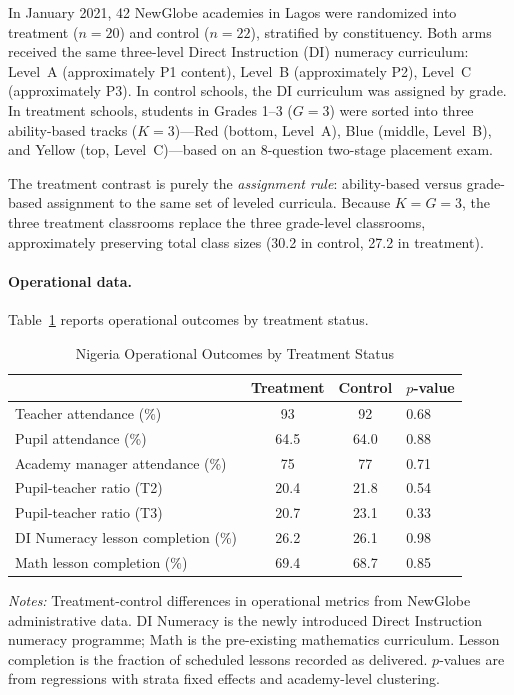 \documentclass[11pt]{article}
\begin{document}
In January 2021, 42 NewGlobe academies in Lagos were randomized into treatment ($n = 20$) and control ($n = 22$), stratified by constituency. Both arms received the same three-level Direct Instruction (DI) numeracy curriculum: Level~A (approximately P1 content), Level~B (approximately P2), Level~C (approximately P3). In control schools, the DI curriculum was assigned by grade. In treatment schools, students in Grades 1--3 ($G = 3$) were sorted into three ability-based tracks ($K = 3$)---Red (bottom, Level~A), Blue (middle, Level~B), and Yellow (top, Level~C)---based on an 8-question two-stage placement exam.

The treatment contrast is purely the \emph{assignment rule}: ability-based versus grade-based assignment to the same set of leveled curricula. Because $K = G = 3$, the three treatment classrooms replace the three grade-level classrooms, approximately preserving total class sizes (30.2 in control, 27.2 in treatment).

\paragraph{Operational data.} Table~\ref{tab:ng_operational} reports operational outcomes by treatment status.

\begin{table}[H]
\centering
\caption{Nigeria Operational Outcomes by Treatment Status}
\label{tab:ng_operational}
\begin{threeparttable}
\begin{tabular}[t]{lccl}
\toprule
 & Treatment & Control & $p$-value \\
\midrule
Teacher attendance (\%) & 93 & 92 & 0.68 \\
Pupil attendance (\%) & 64.5 & 64.0 & 0.88 \\
Academy manager attendance (\%) & 75 & 77 & 0.71 \\
Pupil-teacher ratio (T2) & 20.4 & 21.8 & 0.54 \\
Pupil-teacher ratio (T3) & 20.7 & 23.1 & 0.33 \\
DI Numeracy lesson completion (\%) & 26.2 & 26.1 & 0.98 \\
Math lesson completion (\%) & 69.4 & 68.7 & 0.85 \\
\bottomrule
\end{tabular}
\begin{tablenotes}
\footnotesize
\item \textit{Notes:} Treatment-control differences in operational metrics from NewGlobe administrative data. DI Numeracy is the newly introduced Direct Instruction numeracy programme; Math is the pre-existing mathematics curriculum. Lesson completion is the fraction of scheduled lessons recorded as delivered. $p$-values are from regressions with strata fixed effects and academy-level clustering.
\end{tablenotes}
\end{threeparttable}
\end{table}
\end{document}
